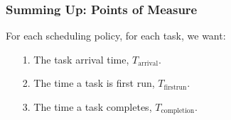 \begin{frame}

\frametitle{Summing Up: Points of Measure}

For each scheduling policy, for each task, we want:

\begin{itemize}

\item[1.] The task arrival time, $T_{\text{arrival}}$.

\item[2.] The time a task is first run, $T_{\text{firstrun}}$.

\item[3.] The time a task completes, $T_{\text{completion}}$.

\end{itemize}





\end{frame}











